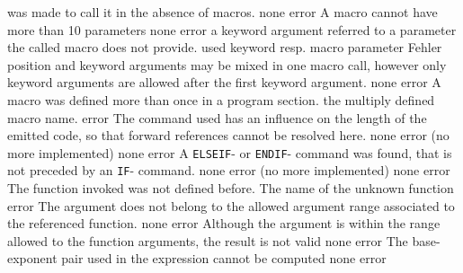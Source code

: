 \documentclass[12pt,twoside]{report}
\newcommand{\tty}[1]{{\tt #1}}
\begin{document}
\begin{description}
{                was made to call it in the absence of macros.}
               {none}
               {error}
               {A macro cannot have more than 10 parameters}
               {none}
               {error}
               {a keyword argument referred to a parameter the
                called macro does not provide.}
               {used keyword resp. macro parameter}
               {Fehler}
               {position and keyword arguments  may be mixed in
                one macro call, however only keyword arguments
                are allowed after the first keyword argument.}
               {none}
               {error}
               {A macro was defined more than once in a program section.}
               {the multiply defined macro name.}
               {error}
               {The command used has an influence on the length of the
                emitted code, so that forward references cannot be resolved
                here.}
               {none}
               {error}
               {(no more implemented)}
               {none}
               {error}
               {A \tty{ELSEIF}- or \tty{ENDIF}- command was found, that is not preceded
                by an \tty{IF}- command.}
               {none}
               {error}
               {(no more implemented)}
               {none}
               {error}
               {The function invoked was not defined before.}
               {The name of the unknown function}
               {error}
               {The argument does not belong to the allowed argument range
                associated to the referenced function.}
               {none}
               {error}
               {Although the argument is within the range allowed to the
                function arguments, the result is not valid}
               {none}
               {error}
               {The base-exponent pair used in the expression cannot be
                computed}
               {none}
               {error}

\end{description}
\end{document}

